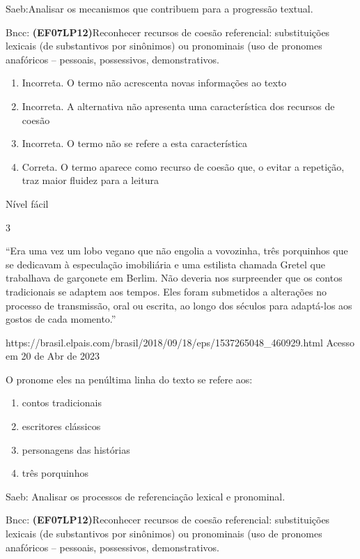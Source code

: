 {{\begin{escolha}
{Saeb:Analisar os mecanismos que contribuem para a progressão textual.

Bncc: \textbf{(EF07LP12)}Reconhecer recursos de coesão referencial:
substituições lexicais (de substantivos por sinônimos) ou pronominais
(uso de pronomes anafóricos -- pessoais, possessivos, demonstrativos.

\begin{enumerate}
\def\labelenumi{\arabic{enumi}.}
\item
  Incorreta. O termo não acrescenta novas informações ao texto
\item
  Incorreta. A alternativa não apresenta uma característica dos recursos
  de coesão
\item
  Incorreta. O termo não se refere a esta característica
\item
  Correta. O termo aparece como recurso de coesão que, o evitar a
  repetição, traz maior fluidez para a leitura
\end{enumerate}

Nível fácil

\num{3}

``Era uma vez um lobo vegano que não engolia a vovozinha, três
porquinhos que se dedicavam à especulação imobiliária e uma estilista
chamada Gretel que trabalhava de garçonete em Berlim. Não deveria nos
surpreender que os contos tradicionais se adaptem aos tempos. Eles foram
submetidos a alterações no processo de transmissão, oral ou escrita, ao
longo dos séculos para adaptá-los aos gostos de cada momento.''

https://brasil.elpais.com/brasil/2018/09/18/eps/1537265048\_460929.html
Acesso em 20 de Abr de 2023

O pronome eles na penúltima linha do texto se refere aos:

\begin{enumerate}
\def\labelenumi{\alph{enumi})}
\item
  contos tradicionais
\item
  escritores clássicos
\item
  personagens das histórias
\item
  três porquinhos
\end{enumerate}

Saeb: Analisar os processos de referenciação lexical e pronominal.

Bncc: \textbf{(EF07LP12)}Reconhecer recursos de coesão referencial:
substituições lexicais (de substantivos por sinônimos) ou pronominais
(uso de pronomes anafóricos -- pessoais, possessivos, demonstrativos.

}
\end{escolha}}}
